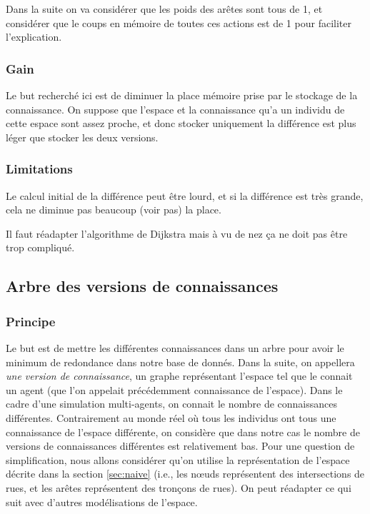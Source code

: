 \documentclass[a4paper]{article}
\begin{document}
Dans la suite on va considérer que les poids des arêtes sont tous de 1, et
considérer que le coups en mémoire de toutes ces actions est de 1 pour faciliter
l'explication.

    \subsubsection{Gain}

Le but recherché ici est de diminuer la place mémoire prise par le stockage de
la connaissance. On suppose que l'espace et la connaissance qu'a un individu de
cette espace sont assez proche, et donc stocker uniquement la différence est
plus léger que stocker les deux versions.

    \subsubsection{Limitations}

Le calcul initial de la différence peut être lourd, et si la différence est très
grande, cela ne diminue pas beaucoup (voir pas) la place.

Il faut réadapter l'algorithme de Dijkstra mais à vu de nez ça ne doit pas être
trop compliqué.

  \subsection{Arbre des versions de connaissances}

    \subsubsection{Principe}

Le but est de mettre les différentes connaissances dans un arbre pour avoir le
minimum de redondance dans notre base de donnés. Dans la suite, on appellera
\emph{une version de connaissance}, un graphe représentant l'espace tel que le
connait un agent (que l'on appelait précédemment connaissance de l'espace). Dans
le cadre d'une simulation multi-agents, on connait le nombre de connaissances
différentes. Contrairement au monde réel où tous les individus ont tous une
connaissance de l'espace différente, on considère que dans notre cas le nombre
de versions de connaissances différentes est relativement bas. Pour une question
de simplification, nous allons considérer qu'on utilise la représentation de
l'espace décrite dans la section \ref{sec:naive} (i.e., les nœuds représentent
des intersections de rues, et les arêtes représentent des tronçons de rues). On
peut réadapter ce qui suit avec d'autres modélisations de l'espace.
\end{document}
